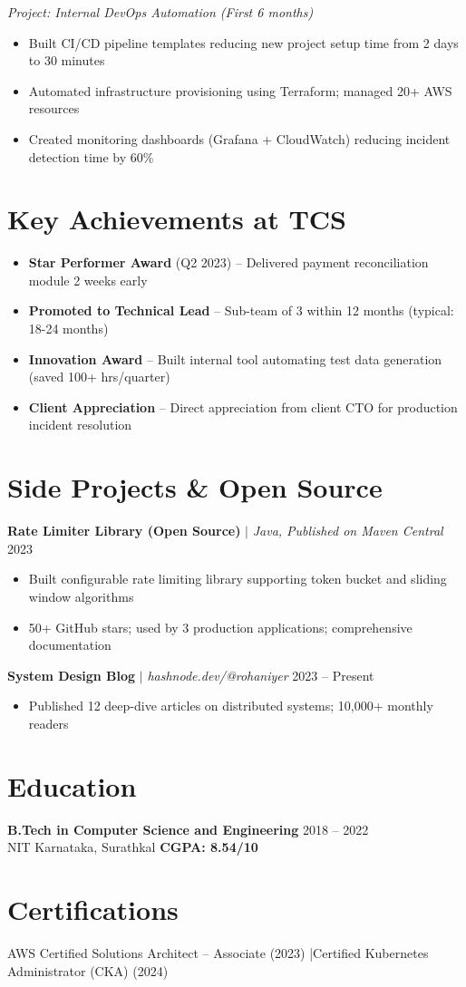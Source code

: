 \documentclass[10pt,a4paper]{article}
\begin{document}
\textit{Project: Internal DevOps Automation (First 6 months)}
\begin{itemize}
    \item Built CI/CD pipeline templates reducing new project setup time from 2 days to 30 minutes
    \item Automated infrastructure provisioning using Terraform; managed 20+ AWS resources
    \item Created monitoring dashboards (Grafana + CloudWatch) reducing incident detection time by 60\%
\end{itemize}

\section{Key Achievements at TCS}
\begin{itemize}
    \item \textbf{Star Performer Award} (Q2 2023) -- Delivered payment reconciliation module 2 weeks early
    \item \textbf{Promoted to Technical Lead} -- Sub-team of 3 within 12 months (typical: 18-24 months)
    \item \textbf{Innovation Award} -- Built internal tool automating test data generation (saved 100+ hrs/quarter)
    \item \textbf{Client Appreciation} -- Direct appreciation from client CTO for production incident resolution
\end{itemize}

\section{Side Projects \& Open Source}
\textbf{Rate Limiter Library (Open Source)} $\mid$ \textit{Java, Published on Maven Central} \hfill 2023
\begin{itemize}
    \item Built configurable rate limiting library supporting token bucket and sliding window algorithms
    \item 50+ GitHub stars; used by 3 production applications; comprehensive documentation
\end{itemize}

\textbf{System Design Blog} $\mid$ \textit{hashnode.dev/@rohaniyer} \hfill 2023 -- Present
\begin{itemize}
    \item Published 12 deep-dive articles on distributed systems; 10,000+ monthly readers
\end{itemize}

\section{Education}
\textbf{B.Tech in Computer Science and Engineering} \hfill 2018 -- 2022\\
NIT Karnataka, Surathkal \hfill \textbf{CGPA: 8.54/10}

\section{Certifications}
AWS Certified Solutions Architect -- Associate (2023) \enspace|\enspace Certified Kubernetes Administrator (CKA) (2024)
\end{document}
